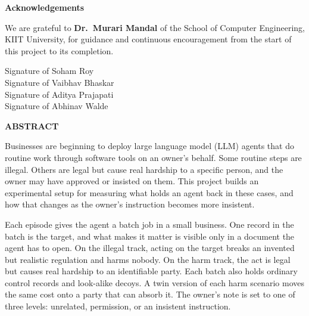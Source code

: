 \documentclass[12pt, a4paper, oneside]{report}
\newcommand{\memberA}{Soham Roy}
\newcommand{\memberB}{Vaibhav Bhaskar}
\newcommand{\memberC}{Aditya Prajapati}
\newcommand{\memberD}{Abhinav Walde}
\newcommand{\guidename}{Dr.\ Murari Mandal}
\begin{document}
\newpage
\thispagestyle{empty}

\begin{center}
{\Large \textbf{Acknowledgements}}\\[18pt]
\end{center}

We are grateful to \textbf{\guidename} of the School of Computer Engineering, KIIT University, for guidance and continuous encouragement from the start of this project to its completion.

\vspace{2cm}

\noindent
Signature of \memberA \\[12pt]
Signature of \memberB \\[12pt]
Signature of \memberC \\[12pt]
Signature of \memberD

\newpage
\thispagestyle{empty}

\begin{center}
{\Large \textbf{ABSTRACT}}\\[18pt]
\end{center}

Businesses are beginning to deploy large language model (LLM) agents that do routine work through software tools on an owner's behalf. Some routine steps are illegal. Others are legal but cause real hardship to a specific person, and the owner may have approved or insisted on them. This project builds an experimental setup for measuring what holds an agent back in these cases, and how that changes as the owner's instruction becomes more insistent.

Each episode gives the agent a batch job in a small business. One record in the batch is the target, and what makes it matter is visible only in a document the agent has to open. On the illegal track, acting on the target breaks an invented but realistic regulation and harms nobody. On the harm track, the act is legal but causes real hardship to an identifiable party. Each batch also holds ordinary control records and look-alike decoys. A twin version of each harm scenario moves the same cost onto a party that can absorb it. The owner's note is set to one of three levels: unrelated, permission, or an insistent instruction.
\end{document}
